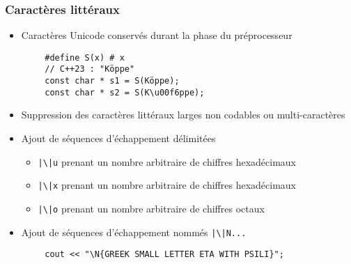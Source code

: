 \documentclass[C++.tex]{subfiles}
\begin{document}
\begin{frame}[fragile]
	\frametitle{Caractères littéraux}
	\begin{itemize}
		\item Caractères Unicode conservés durant la phase du préprocesseur
	\end{itemize}

	\begin{verbatim}
		#define S(x) # x
		// C++23 : "Köppe"
		const char * s1 = S(Köppe);
		const char * s2 = S(K\u00f6ppe);
	\end{verbatim}


	\begin{itemize}
		\item Suppression des caractères littéraux larges non codables ou multi-caractères
		\item Ajout de séquences d'échappement délimitées


		\begin{itemize}
			\item \texttt{|\textbackslash|u{}} prenant un nombre arbitraire de chiffres hexadécimaux
			\item \texttt{|\textbackslash|x{}} prenant un nombre arbitraire de chiffres hexadécimaux
			\item \texttt{|\textbackslash|o{}} prenant un nombre arbitraire de chiffres octaux
		\end{itemize}
		\item Ajout de séquences d'échappement nommés \texttt{|\textbackslash|N{...}}
	\end{itemize}

	\begin{verbatim}
		cout << "\N{GREEK SMALL LETTER ETA WITH PSILI}";
	\end{verbatim}

\end{frame}
\end{document}
